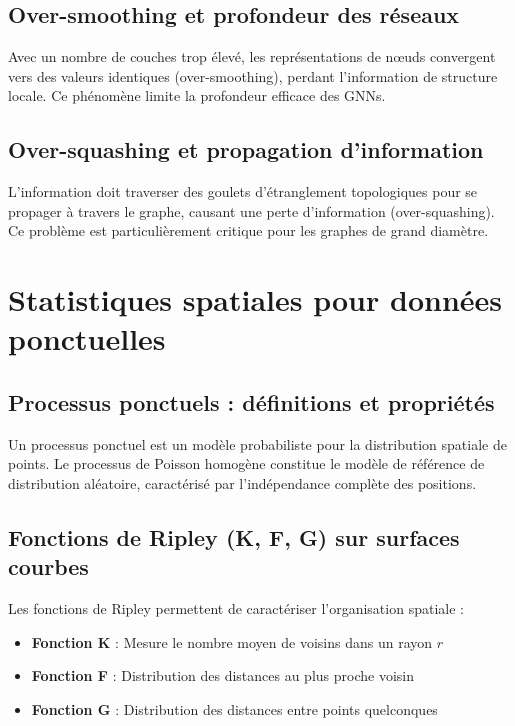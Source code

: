 \subsection{Over-smoothing et profondeur des réseaux}

Avec un nombre de couches trop élevé, les représentations de nœuds convergent vers des valeurs identiques (over-smoothing), perdant l'information de structure locale. Ce phénomène limite la profondeur efficace des GNNs.

\subsection{Over-squashing et propagation d'information}

L'information doit traverser des goulets d'étranglement topologiques pour se propager à travers le graphe, causant une perte d'information (over-squashing). Ce problème est particulièrement critique pour les graphes de grand diamètre.

\section{Statistiques spatiales pour données ponctuelles}

\subsection{Processus ponctuels : définitions et propriétés}

Un processus ponctuel est un modèle probabiliste pour la distribution spatiale de points. Le processus de Poisson homogène constitue le modèle de référence de distribution aléatoire, caractérisé par l'indépendance complète des positions.

\subsection{Fonctions de Ripley (K, F, G) sur surfaces courbes}

Les fonctions de Ripley permettent de caractériser l'organisation spatiale :
\begin{itemize}
    \item \textbf{Fonction K} : Mesure le nombre moyen de voisins dans un rayon $r$
    \item \textbf{Fonction F} : Distribution des distances au plus proche voisin
    \item \textbf{Fonction G} : Distribution des distances entre points quelconques
\end{itemize}

